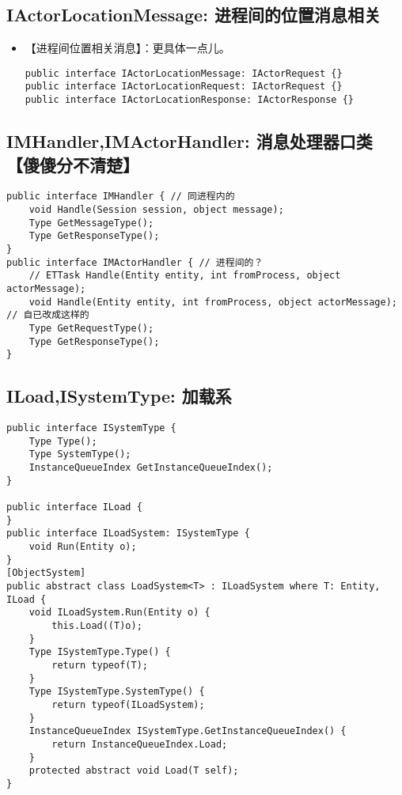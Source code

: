 \documentclass[9pt, b5paper]{article}
\begin{document}
\subsection{IActorLocationMessage: 进程间的位置消息相关}
\label{sec-1-3}
\begin{itemize}
\item 【进程间位置相关消息】：更具体一点儿。
\begin{verbatim}
public interface IActorLocationMessage: IActorRequest {}
public interface IActorLocationRequest: IActorRequest {}
public interface IActorLocationResponse: IActorResponse {}
\end{verbatim}
\end{itemize}
\subsection{IMHandler,IMActorHandler: 消息处理器口类【傻傻分不清楚】}
\label{sec-1-4}
\begin{verbatim}
public interface IMHandler { // 同进程内的
    void Handle(Session session, object message);
    Type GetMessageType();
    Type GetResponseType();
}
public interface IMActorHandler { // 进程间的？
    // ETTask Handle(Entity entity, int fromProcess, object actorMessage);
    void Handle(Entity entity, int fromProcess, object actorMessage); // 自已改成这样的
    Type GetRequestType();
    Type GetResponseType();
}
\end{verbatim}
\subsection{ILoad,ISystemType: 加载系}
\label{sec-1-5}
\begin{verbatim}
public interface ISystemType {
    Type Type();
    Type SystemType();
    InstanceQueueIndex GetInstanceQueueIndex();
}

public interface ILoad {
}
public interface ILoadSystem: ISystemType {
    void Run(Entity o);
}
[ObjectSystem]
public abstract class LoadSystem<T> : ILoadSystem where T: Entity, ILoad {
    void ILoadSystem.Run(Entity o) {
        this.Load((T)o);
    }
    Type ISystemType.Type() {
        return typeof(T);
    }
    Type ISystemType.SystemType() {
        return typeof(ILoadSystem);
    }
    InstanceQueueIndex ISystemType.GetInstanceQueueIndex() {
        return InstanceQueueIndex.Load;
    }
    protected abstract void Load(T self);
}
\end{verbatim}
\end{document}

